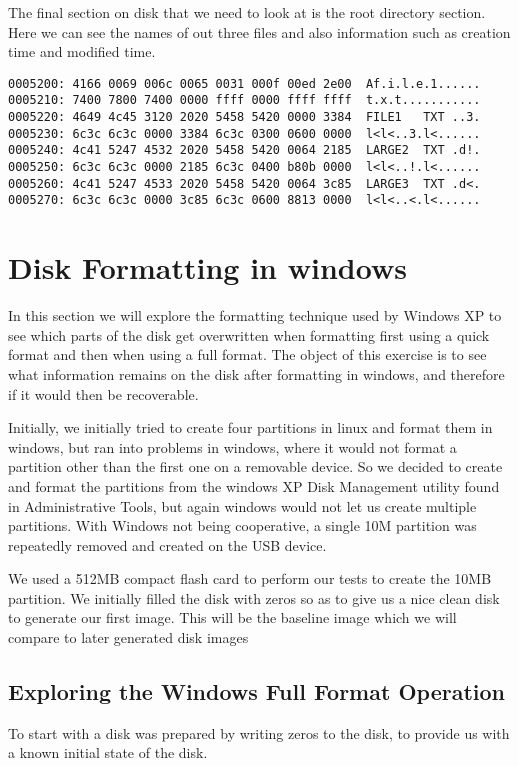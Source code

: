 \documentclass[a4paper,
    11pt,
    normalheadings,
    parindent,
    UKenglish,
    abstracton,
    ]{scrartcl}
\begin{document}
The final section on disk that we need to look at is the root directory section. Here we can see the names of out three files and also information such as creation time and modified time.
\begin{verbatim}
0005200: 4166 0069 006c 0065 0031 000f 00ed 2e00  Af.i.l.e.1......
0005210: 7400 7800 7400 0000 ffff 0000 ffff ffff  t.x.t...........
0005220: 4649 4c45 3120 2020 5458 5420 0000 3384  FILE1   TXT ..3.
0005230: 6c3c 6c3c 0000 3384 6c3c 0300 0600 0000  l<l<..3.l<......
0005240: 4c41 5247 4532 2020 5458 5420 0064 2185  LARGE2  TXT .d!.
0005250: 6c3c 6c3c 0000 2185 6c3c 0400 b80b 0000  l<l<..!.l<......
0005260: 4c41 5247 4533 2020 5458 5420 0064 3c85  LARGE3  TXT .d<.
0005270: 6c3c 6c3c 0000 3c85 6c3c 0600 8813 0000  l<l<..<.l<......
\end{verbatim}

\section{Disk Formatting in windows}

In this section we will explore the formatting technique used by Windows XP to see which parts of the disk get overwritten when formatting first using a quick format and then when using a full format. The object of this exercise is to see what information remains on the disk after formatting in windows, and therefore if it would then be recoverable.

Initially, we initially tried to create four partitions in linux and format them in windows, but ran into problems in windows, where it would not format a partition other than the first one on a removable device. So we decided to create and format the partitions from the windows XP Disk Management utility found in Administrative Tools, but again windows would not let us create multiple partitions. With Windows not being cooperative,  a single 10M partition was repeatedly removed and created on the USB device.

We used a 512MB compact flash card to perform our tests to create the 10MB partition. We initially filled the disk with zeros so as to give us a nice clean disk to generate our first image. This will be the baseline image which we will compare to later generated disk images

\subsection{Exploring the Windows Full Format Operation}
To start with a disk was prepared by writing zeros to the disk, to provide us with a known initial state of the disk.
\end{document}
